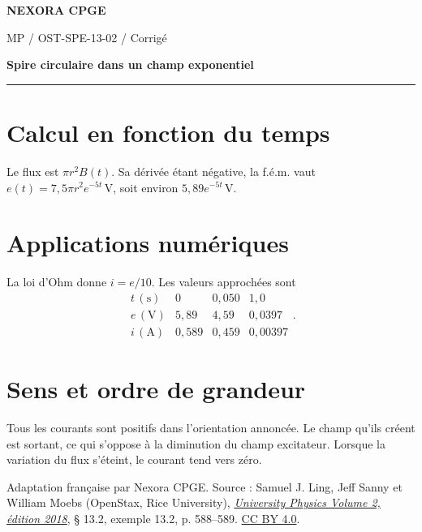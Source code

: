 \documentclass[11pt,a4paper]{article}
\begin{document}
\makeatletter
\def\@oddfoot{\footnotesize Download for free at \url{https://openstax.org/details/books/university-physics-volume-2}.\hfil\thepage}
\let\@evenfoot\@oddfoot
\makeatother
{\small\bfseries\color{nexorablue} NEXORA CPGE}\par
{\small MP / OST-SPE-13-02 / Corrigé}\par
{\LARGE\bfseries Spire circulaire dans un champ exponentiel}\par
\vspace{0.25em}\hrule\vspace{0.6em}

\section*{Calcul en fonction du temps}
Le flux est $\pi r^2 B(t)$. Sa dérivée étant négative, la f.é.m. vaut $e(t)=7{,}5\pi r^2e^{-5t}\,\mathrm V$, soit environ $5{,}89e^{-5t}\,\mathrm V$.

\section*{Applications numériques}
La loi d’Ohm donne $i=e/10$. Les valeurs approchées sont
\[ \begin{array}{c|ccc} t\,(\mathrm s)&0&0{,}050&1{,}0\\ \hline e\,(\mathrm V)&5{,}89&4{,}59&0{,}0397\\ i\,(\mathrm A)&0{,}589&0{,}459&0{,}00397 \end{array}. \]

\section*{Sens et ordre de grandeur}
Tous les courants sont positifs dans l’orientation annoncée. Le champ qu’ils créent est sortant, ce qui s’oppose à la diminution du champ excitateur. Lorsque la variation du flux s’éteint, le courant tend vers zéro.

\bigskip
{\footnotesize Adaptation française par Nexora CPGE. Source : Samuel J. Ling, Jeff Sanny et William Moebs (OpenStax, Rice University),
\href{https://d3bxy9euw4e147.cloudfront.net/oscms-prod/media/documents/UniversityPhysicsVolume2-OP.pdf\#page=598}{\textit{University Physics Volume 2, édition 2018}}, § 13.2, exemple 13.2, p. 588–589.
\href{https://creativecommons.org/licenses/by/4.0/}{CC BY 4.0}.}
\end{document}
